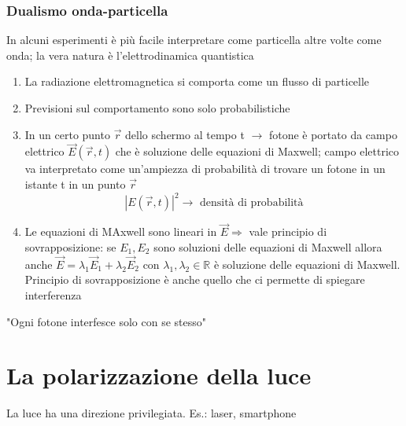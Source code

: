 \documentclass[a4paper,11pt]{report}
\theoremstyle{remark}
\theoremstyle{definition}
\newcommand{\R}{\mathbb{R}}
\begin{document}
\subsection*{Dualismo onda-particella}
In alcuni esperimenti è più facile interpretare come particella altre volte come onda; la vera natura è l'elettrodinamica quantistica
\begin{enumerate}
    \item La radiazione elettromagnetica si comporta come un flusso di particelle
    \item Previsioni sul comportamento sono solo probabilistiche
    \item In un certo punto $\vec{r}$ dello schermo al tempo t $\rightarrow$ fotone è portato da campo elettrico $\vec{E}(\vec{r}, t)$ che è soluzione delle equazioni di Maxwell; campo elettrico va interpretato come un'ampiezza di probabilità di trovare un fotone in un istante t in un punto $\vec{r}$
    \begin{equation*}
        {|E(\vec{r},t)|}^2 \rightarrow \text{ densità di probabilità}
    \end{equation*}
    \item Le equazioni di MAxwell sono lineari in $\vec{E} \Rightarrow$ vale principio di sovrapposizione: se $E_1, E_2$ sono soluzioni delle equazioni di Maxwell allora anche $\vec{E} = \lambda_1\vec{E}_1 + \lambda_2 \vec{E}_2$ con $\lambda_1,\lambda_2 \in \R$ è soluzione delle equazioni di Maxwell. Principio di sovrapposizione è anche quello che ci permette di spiegare interferenza
\end{enumerate}
"Ogni fotone interfesce solo con se stesso"

\chapter{La polarizzazione della luce}
La luce ha una direzione privilegiata. Es.: laser, smartphone \newline
\end{document}
